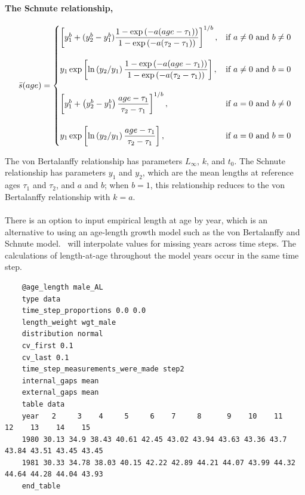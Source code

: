 \paragraph[Schnute]{The Schnute relationship, }

\begin{equation}
\bar{s}(age)=\displaystyle\begin{cases}
  \left[ y_1^b + (y_2^b - y_1^b) \dfrac{1-\exp \left(-a(age - \tau_1) \right)}{1-\exp \left(-a(\tau_2 - \tau_1) \right)} \right]^{1/b}, & \text{if $a\ne0$ and $b\ne0$} \\
  \AddVspace
  y_1 \exp \left[ \ln \left( y_2 / y_1 \right) \dfrac{1-\exp \left(-a(age - \tau_1) \right)}{1-\exp \left(-a(\tau_2 - \tau_1) \right)} \right], & \text{if $a\ne0$ and $b=0$} \\
  \AddVspace
  \left[ y_1^b + \left( y_2^b - y_1^b \right) \dfrac{age-\tau_1}{\tau_2 - \tau_1} \right]^{1/b}, & \text{if $a=0$ and $b\ne0$} \\
  \AddVspace
  y_1 \exp \left[ \ln \left( y_2/y_1 \right) \dfrac{age-\tau_1}{\tau_2 - \tau_1} \right] , & \text{if $a=0$ and $b=0$} \\
  \end{cases}
\end{equation}

The von Bertalanffy relationship has parameters $L_\infty$, $k$, and $t_0$. The Schnute relationship \citep{836} has parameters $y_1$ and $y_2$, which are the mean lengths at reference ages $\tau_1$ and $\tau_2$, and $a$ and $b$; when $b=1$, this relationship reduces to the von Bertalanffy relationship with $k=a$.

\paragraph[Data]{}

There is an option to input empirical length at age by year, which is an alternative to using an age-length growth model such as the von Bertalanffy and Schnute model. \CNAME\ will interpolate values for missing years across time steps. The calculations of length-at-age throughout the model years occur in the same time step.

{\small{\begin{verbatim}
	@age_length male_AL
	type data
	time_step_proportions 0.0 0.0
	length_weight wgt_male
	distribution normal
	cv_first 0.1
	cv_last 0.1
	time_step_measurements_were_made step2
	internal_gaps mean
	external_gaps mean
	table data
	year   2     3    4     5     6    7     8      9    10    11    12    13    14    15
	1980 30.13 34.9 38.43 40.61 42.45 43.02 43.94 43.63 43.36 43.7 43.84 43.51 43.45 43.45
	1981 30.33 34.78 38.03 40.15 42.22 42.89 44.21 44.07 43.99 44.32 44.64 44.28 44.04 43.93
	end_table
\end{verbatim}}}

